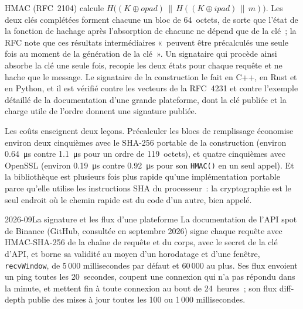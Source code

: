 HMAC (RFC~2104) calcule $H\big((K \oplus \mathit{opad}) \,\|\, H((K \oplus \mathit{ipad}) \,\|\, m)\big)$. Les deux clés complétées
forment chacune un bloc de 64~octets, de sorte que l'état de la fonction de hachage après l'absorption de chacune ne dépend que de la clé~; la RFC note que ces
résultats intermédiaires «~peuvent être précalculés une seule fois au moment de la génération de la clé~». Un signataire qui procède ainsi absorbe la
clé une seule fois, recopie les deux états pour chaque requête et ne hache que le message. Le signataire de la construction le fait en C++, en Rust et
en Python, et il est vérifié contre les vecteurs de la RFC~4231 et contre l'exemple détaillé de la documentation d'une grande plateforme, dont
la clé publiée et la charge utile de l'ordre donnent une signature publiée.

\label{lst:ll:websocket-rest-tls-and-json-at-speed:hmac}

Les coûts enseignent deux leçons. Précalculer les blocs de remplissage économise environ deux cinquièmes avec le SHA-256 portable de la construction (environ
\qty{0.64}{\micro\second} contre \qty{1.1}{\micro\second} pour un ordre de 119~octets), et quatre cinquièmes avec OpenSSL (environ
\qty{0.19}{\micro\second} contre \qty{0.92}{\micro\second} pour son \texttt{HMAC()} en un seul appel). Et la bibliothèque est plusieurs fois
plus rapide qu'une implémentation portable parce qu'elle utilise les instructions SHA du processeur~: la cryptographie est le seul endroit où
le chemin rapide est du code d'un autre, bien appelé.

\begin{dated}{2026-09}{La signature et les flux d'une plateforme}\label{dat:ll:websocket-rest-tls-and-json-at-speed:venue}
La documentation de l'API spot de Binance (GitHub, consultée en septembre 2026) signe chaque requête avec HMAC-SHA-256 de la chaîne de requête
et du corps, avec le secret de la clé d'API, et borne sa validité au moyen d'un horodatage et d'une fenêtre, \texttt{recvWindow}, de 5\,000
millisecondes par défaut et 60\,000 au plus. Ses flux  envoient un ping toutes les 20~secondes, coupent une connexion qui n'a pas
répondu dans la minute, et mettent fin à toute connexion au bout de 24~heures~; son flux diff-depth publie des mises à jour toutes les 100 ou 1\,000
millisecondes.
\end{dated}

